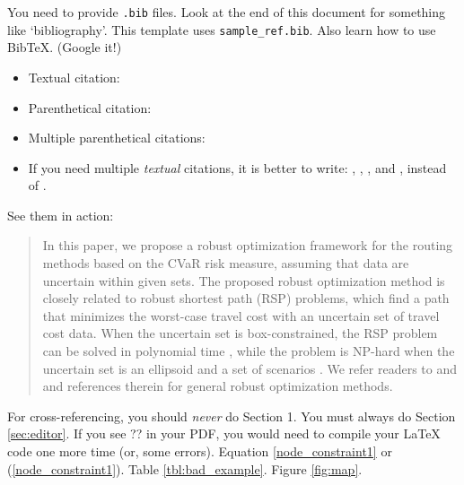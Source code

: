 \documentclass[letterpaper, 11pt]{article}
\begin{document}
You need to provide \texttt{.bib} files. Look at the end of this document for something like `bibliography'. This template uses \texttt{sample\_ref.bib}. Also learn how to use BibTeX. (Google it!)

\begin{itemize}
\item Textual citation: \citet{Kwon2013rsp}
\item Parenthetical citation: \citep{Kwon2013rsp}
\item Multiple parenthetical citations: \citep{Bertsimas2004,Chaerani2005,Kouvelis1996,gabrel2012recent}
\item If you need multiple \emph{textual} citations, it is better to write: \citet{Bertsimas2004}, \citet{Chaerani2005}, \citet{Kouvelis1996}, and \citet{gabrel2012recent}, instead of \citet{Bertsimas2004,Chaerani2005,Kouvelis1996,gabrel2012recent}.

\end{itemize}

See them in action:
\begin{quote}
In this paper, we propose a robust optimization framework for the routing methods based on the CVaR risk measure, assuming that data are uncertain within given sets. The proposed robust optimization method is closely related to robust shortest path (RSP) problems, which find a path that minimizes the worst-case travel cost with an uncertain set of travel cost data. When the uncertain set is box-constrained, the RSP problem can be solved in polynomial time \citep{Bertsimas2003network}, while the problem is NP-hard when the uncertain set is an ellipsoid \citep{Bertsimas2004,Chaerani2005} and a set of scenarios \citep{Kouvelis1996}. We refer readers to \citet{ben2009robust} and \citet{gabrel2012recent} and references therein for general robust optimization methods. 
\end{quote}

For cross-referencing, you should \emph{never} do Section 1. You must always do Section \ref{sec:editor}. If you see ?? in your PDF, you would need to compile your LaTeX code one more time (or, some errors). Equation \eqref{node_constraint1} or (\ref{node_constraint1}). Table \ref{tbl:bad_example}. Figure \ref{fig:map}.
\end{document}
